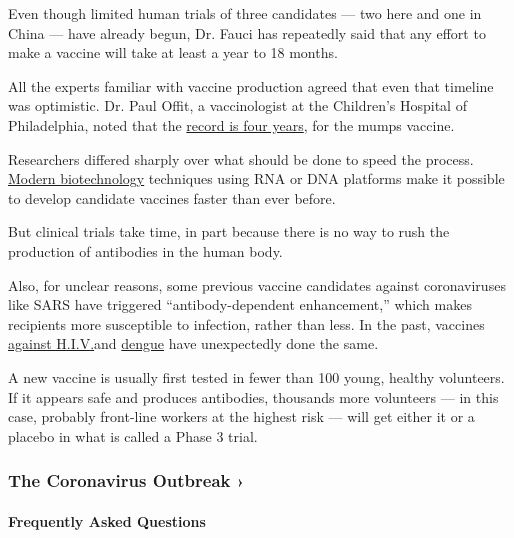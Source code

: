 Even though limited human trials of three candidates --- two here and
one in China --- have already begun, Dr. Fauci has repeatedly said that
any effort to make a vaccine will take at least a year to 18 months.

All the experts familiar with vaccine production agreed that even that
timeline was optimistic. Dr. Paul Offit, a vaccinologist at the
Children's Hospital of Philadelphia, noted that the
\href{https://www.cdc.gov/vaccines/pubs/pinkbook/mumps.html}{record is
four years}, for the mumps vaccine.

Researchers differed sharply over what should be done to speed the
process.
\href{https://www.nytimes3xbfgragh.onion/2020/04/08/health/coronavirus-vaccines.html}{Modern
biotechnology} techniques using RNA or DNA platforms make it possible to
develop candidate vaccines faster than ever before.

But clinical trials take time, in part because there is no way to rush
the production of antibodies in the human body.

Also, for unclear reasons, some previous vaccine candidates against
coronaviruses like SARS have triggered ``antibody-dependent
enhancement,'' which makes recipients more susceptible to infection,
rather than less. In the past, vaccines
\href{https://www.ncbi.nlm.nih.gov/pmc/articles/PMC3490694/}{against
H.I.V}\href{https://www.ncbi.nlm.nih.gov/pmc/articles/PMC5443089/}{.}and
\href{https://www.thelancet.com/journals/laninf/article/PIIS1473-3099(18)30023-9/fulltext}{dengue}
have unexpectedly done the same.

A new vaccine is usually first tested in fewer than 100 young, healthy
volunteers. If it appears safe and produces antibodies, thousands more
volunteers --- in this case, probably front-line workers at the highest
risk --- will get either it or a placebo in what is called a Phase 3
trial.

\href{https://www.nytimes3xbfgragh.onion/news-event/coronavirus?action=click\&pgtype=Article\&state=default\&region=MAIN_CONTENT_3\&context=storylines_faq}{}

\hypertarget{the-coronavirus-outbreak-}{%
\subsubsection{The Coronavirus Outbreak
›}\label{the-coronavirus-outbreak-}}

\hypertarget{frequently-asked-questions}{%
\paragraph{Frequently Asked
Questions}\label{frequently-asked-questions}}

